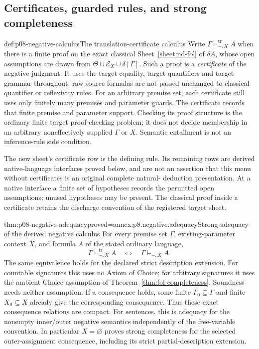 \subsection{Certificates, guarded rules, and strong completeness}

\begin{hbdefinition}{def:p08-negative-calculus}{The translation-certificate calculus}
Write \(\Gamma\vdash^{\mathrm{tr}}_{-,X}A\) when there is a finite proof
on the exact classical Sheet~\ref{sheet:nd-fol} of \(\delta A\), whose
open assumptions are drawn from
\(\Theta\cup\mathcal E_X\cup\delta[\Gamma]\).  Such a proof is a
\emph{certificate} of the negative judgment.  It uses the target equality,
target quantifiers and target grammar throughout; raw source formulas are
not passed unchanged to classical quantifier or reflexivity rules.
For an arbitrary premise set, each certificate still uses only finitely
many premises and parameter guards.  The certificate records that finite
premise and parameter support.  Checking its proof structure is the ordinary
finite target proof-checking problem; it does not decide membership in an
arbitrary noneffectively supplied \(\Gamma\) or \(X\).  Semantic entailment
is not an inference-rule side condition.

The new sheet's certificate row is the defining rule.  Its remaining rows
are derived native-language interfaces proved below, and are not an assertion
that this menu without certificates is an original complete natural-
deduction presentation.  At a native interface a finite set of hypotheses
records the permitted open assumptions; unused hypotheses may be present.
The classical proof inside a certificate retains the discharge convention
of the registered target sheet.
\end{hbdefinition}


\begin{hbtheorem}{thm:p08-negative-adequacy}{proved=annex:p8.negative.adequacy}{Strong adequacy of the derived negative calculus}
For every premise set \(\Gamma\), existing-parameter context \(X\), and
formula \(A\) of the stated ordinary language,
\[
 \Gamma\vdash^{\mathrm{tr}}_{-,X}A
 \quad\Longleftrightarrow\quad \Gamma\models_{-,X}A.
\]
The same equivalence holds for the declared strict description extension.
For countable signatures this uses no Axiom of Choice; for arbitrary
signatures it uses the ambient Choice assumption of
Theorem~\ref{thm:fol-completeness}.  Soundness needs neither assumption.
If a consequence holds, some finite \(\Gamma_0\subseteq\Gamma\) and
finite \(X_0\subseteq X\) already give the corresponding consequence.
Thus these exact consequence relations are compact.  For sentences, this is
adequacy for the nonempty inner/outer negative semantics independently of
the free-variable convention.  In particular \(X=\varnothing\) proves
strong completeness for the selected outer-assignment consequence,
including its strict partial-description extension.
\end{hbtheorem}

